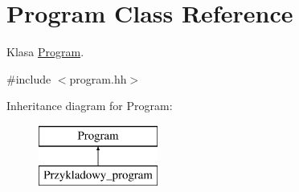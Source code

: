\hypertarget{class_program}{\section{Program Class Reference}
\label{class_program}
}


Klasa \hyperlink{class_program}{Program}.  




{\ttfamily \#include $<$program.\-hh$>$}

Inheritance diagram for Program\-:\begin{figure}[H]
\begin{center}
\leavevmode
\includegraphics[height=2.000000cm]{class_program}
\end{center}
\end{figure}
